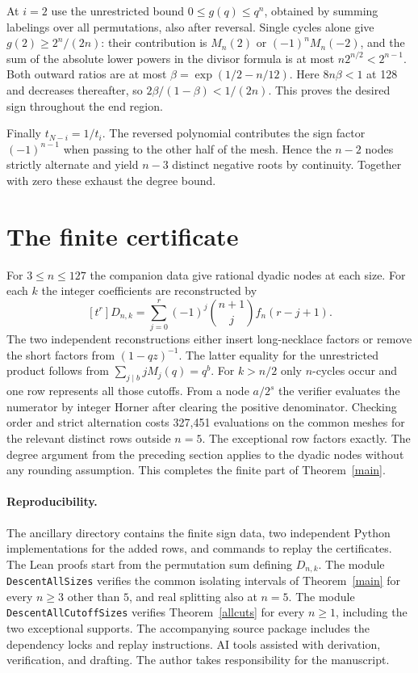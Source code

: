 \documentclass[11pt]{article}
\begin{document}
At $i=2$ use the unrestricted bound $0\le g(q)\le q^n$, obtained by summing labelings over all permutations, also after reversal. Single cycles alone give $g(2)\ge2^n/(2n)$: their contribution is $M_n(2)$ or $(-1)^nM_n(-2)$, and the sum of the absolute lower powers in the divisor formula is at most $n2^{n/2}<2^{n-1}$. Both outward ratios are at most $\beta=\exp(1/2-n/12)$. Here $8n\beta<1$ at 128 and decreases thereafter, so $2\beta/(1-\beta)<1/(2n)$. This proves the desired sign throughout the end region.

Finally $t_{N-i}=1/t_i$. The reversed polynomial contributes the sign factor $(-1)^{n-1}$ when passing to the other half of the mesh. Hence the $n-2$ nodes strictly alternate and yield $n-3$ distinct negative roots by continuity. Together with zero these exhaust the degree bound.

\section{The finite certificate}
For $3\le n\le127$ the companion data give rational dyadic nodes at each size. For each $k$ the integer coefficients are reconstructed by
\[
 [t^r]D_{n,k}=\sum_{j=0}^r(-1)^j\binom{n+1}{j} f_n(r-j+1).
\]
The two independent reconstructions either insert long-necklace factors or remove the short factors from $(1-qz)^{-1}$. The latter equality for the unrestricted product follows from $\sum_{j\mid b}jM_j(q)=q^b$. For $k>n/2$ only $n$-cycles occur and one row represents all those cutoffs. From a node $a/2^s$ the verifier evaluates the numerator by integer Horner after clearing the positive denominator. Checking order and strict alternation costs 327,451 evaluations on the common meshes for the relevant distinct rows outside $n=5$. The exceptional row factors exactly. The degree argument from the preceding section applies to the dyadic nodes without any rounding assumption. This completes the finite part of Theorem~\ref{main}.



\paragraph{Reproducibility.}
The ancillary directory contains the finite sign data, two independent Python implementations for the added rows, and commands to replay the certificates.
The Lean proofs start from the permutation sum defining $D_{n,k}$. The module \texttt{DescentAllSizes} verifies the common isolating intervals of Theorem~\ref{main} for every $n\ge3$ other than $5$, and real splitting also at $n=5$. The module \texttt{DescentAllCutoffSizes} verifies Theorem~\ref{allcuts} for every $n\ge1$, including the two exceptional supports. The accompanying source package includes the dependency locks and replay instructions. AI tools assisted with derivation, verification, and drafting. The author takes responsibility for the manuscript.
\end{document}
